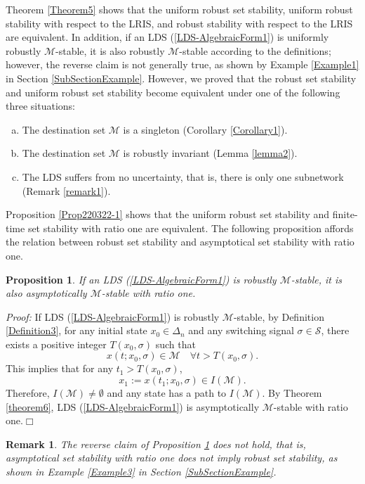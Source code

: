 \documentclass[11pt,onecolumn]{article}
\newtheorem{proposition}{Proposition}
\newtheorem{remark}{Remark}
\begin{document}
 Theorem \ref{Theorem5} shows that the uniform robust set stability, uniform robust stability with respect to the LRIS, and robust stability with respect to the LRIS are equivalent. In addition, if an LDS (\ref{LDS-AlgebraicForm1}) is uniformly robustly $ \mathcal M$-stable, it is also robustly $ \mathcal M$-stable according to the definitions; however, the reverse claim is not generally true, as shown by  Example \ref{Example1} in Section \ref{SubSectionExample}. However, we proved that the robust set stability and uniform robust set stability become equivalent under one of the following three situations:
 \begin{enumerate}[(a)]
    \item The destination set $\mathcal M$ is a singleton (Corollary \ref{Corollary1}).
    \item The destination set $\mathcal M$ is robustly invariant (Lemma \ref{lemma2}).
    \item The LDS suffers from no uncertainty, that is, there is only one subnetwork (Remark \ref{remark1}).
 \end{enumerate}

 Proposition \ref{Prop220322-1} shows that the uniform robust set stability and finite-time set stability with ratio one are equivalent. The following proposition affords the relation between robust set stability and asymptotical set stability with ratio one.

 \begin{proposition}\label{Proposition7}
     If an LDS (\ref{LDS-AlgebraicForm1}) is robustly $\mathcal M$-stable, it is also asymptotically $\mathcal M$-stable with ratio one.
 \end{proposition}

 {\it Proof:} If LDS (\ref{LDS-AlgebraicForm1}) is robustly $\mathcal M$-stable, by Definition \ref{Definition3}, for any initial state $x_0\in\Delta_n$ and any switching signal $\sigma\in\mathcal S$, there exists a positive integer $T(x_0,\sigma)$ such that
   \[x(t;x_0,\sigma)\in\mathcal M\quad\forall t> T(x_0,\sigma).\]
  This implies that for any $t_1 >T(x_0,\sigma)$,
  \[x_1:=x(t_1;x_0,\sigma)\in I(\mathcal M).\]
  Therefore, $I(\mathcal M)\neq\emptyset$ and any state has a path to $I(\mathcal M)$. By Theorem \ref{theorem6}, LDS  (\ref{LDS-AlgebraicForm1}) is asymptotically $\mathcal M$-stable with ratio one.\hfill$\Box$

 \begin{remark}
     The reverse claim of Proposition \ref{Proposition7} does not hold, that is, asymptotical set stability with ratio one does not imply robust set stability, as shown in Example \ref{Example3} in Section \ref{SubSectionExample}.
 \end{remark}
\end{document}
